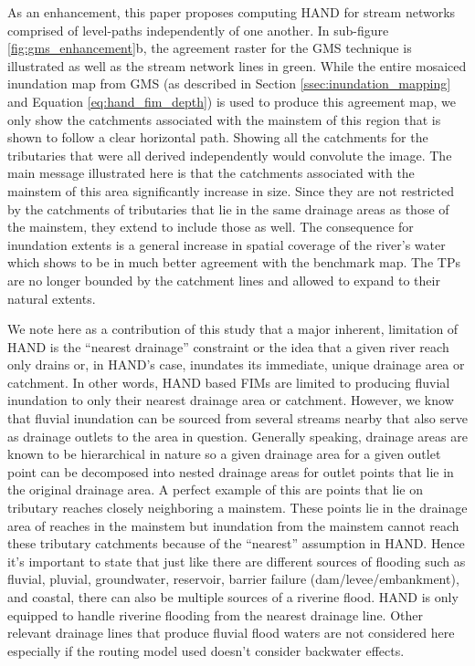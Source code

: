 \documentclass[draft]{dependencies/agujournal2019}
\begin{document}
As an enhancement, this paper proposes computing HAND for stream networks comprised of level-paths independently of one another.
In sub-figure \ref{fig:gms_enhancement}b, the agreement raster for the GMS technique is illustrated as well as the stream network lines in green.
While the entire mosaiced inundation map from GMS (as described in Section \ref{ssec:inundation_mapping} and Equation \ref{eq:hand_fim_depth}) is used to produce this agreement map, we only show the catchments associated with the mainstem of this region that is shown to follow a clear horizontal path.
Showing all the catchments for the tributaries that were all derived independently would convolute the image.
The main message illustrated here is that the catchments associated with the mainstem of this area significantly increase in size.
Since they are not restricted by the catchments of tributaries that lie in the same drainage areas as those of the mainstem, they extend to include those as well.
The consequence for inundation extents is a general increase in spatial coverage of the river's water which shows to be in much better agreement with the benchmark map.
The TPs are no longer bounded by the catchment lines and allowed to expand to their natural extents.

We note here as a contribution of this study that a major inherent, limitation of HAND is the ``nearest drainage'' constraint or the idea that a given river reach only drains or, in HAND's case, inundates its immediate, unique drainage area or catchment.
In other words, HAND based FIMs are limited to producing fluvial inundation to only their nearest drainage area or catchment.
However, we know that fluvial inundation can be sourced from several streams nearby that also serve as drainage outlets to the area in question.
Generally speaking, drainage areas are known to be hierarchical in nature so a given drainage area for a given outlet point can be decomposed into nested drainage areas for outlet points that lie in the original drainage area.
A perfect example of this are points that lie on tributary reaches closely neighboring a mainstem.
These points lie in the drainage area of reaches in the mainstem but inundation from the mainstem cannot reach these tributary catchments because of the ``nearest'' assumption in HAND.
Hence it's important to state that just like there are different sources of flooding such as fluvial, pluvial, groundwater, reservoir, barrier failure (dam/levee/embankment), and coastal, there can also be multiple sources of a riverine flood.
HAND is only equipped to handle riverine flooding from the nearest drainage line.
Other relevant drainage lines that produce fluvial flood waters are not considered here especially if the routing model used doesn't consider backwater effects.
\end{document}
